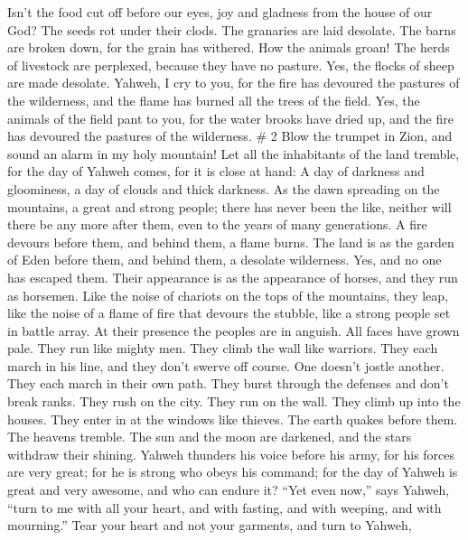 Isn't the food cut off before our eyes, joy and gladness from the house
of our God?  The seeds rot under their clods. The granaries
are laid desolate. The barns are broken down, for the grain has
withered.  How the animals groan! The herds of livestock
are perplexed, because they have no pasture. Yes, the flocks of sheep
are made desolate.  Yahweh, I cry to you, for the fire has
devoured the pastures of the wilderness, and the flame has burned all
the trees of the field.  Yes, the animals of the field pant
to you, for the water brooks have dried up, and the fire has devoured
the pastures of the wilderness. \# 2  Blow the trumpet in
Zion, and sound an alarm in my holy mountain! Let all the inhabitants of
the land tremble, for the day of Yahweh comes, for it is close at hand:
 A day of darkness and gloominess, a day of clouds and thick
darkness. As the dawn spreading on the mountains, a great and strong
people; there has never been the like, neither will there be any more
after them, even to the years of many generations.  A fire
devours before them, and behind them, a flame burns. The land is as the
garden of Eden before them, and behind them, a desolate wilderness. Yes,
and no one has escaped them.  Their appearance is as the
appearance of horses, and they run as horsemen.  Like the
noise of chariots on the tops of the mountains, they leap, like the
noise of a flame of fire that devours the stubble, like a strong people
set in battle array.  At their presence the peoples are in
anguish. All faces have grown pale.  They run like mighty
men. They climb the wall like warriors. They each march in his line, and
they don't swerve off course.  One doesn't jostle another.
They each march in their own path. They burst through the defenses and
don't break ranks.  They rush on the city. They run on the
wall. They climb up into the houses. They enter in at the windows like
thieves.  The earth quakes before them. The heavens
tremble. The sun and the moon are darkened, and the stars withdraw their
shining.  Yahweh thunders his voice before his army, for
his forces are very great; for he is strong who obeys his command; for
the day of Yahweh is great and very awesome, and who can endure it?
 ``Yet even now,'' says Yahweh, ``turn to me with all your
heart, and with fasting, and with weeping, and with mourning.''
 Tear your heart and not your garments, and turn to Yahweh,
